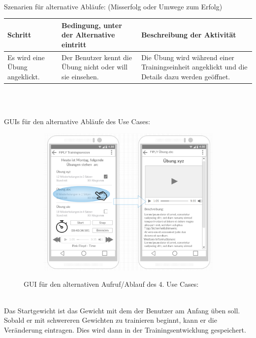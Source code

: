 \documentclass[FIPLY_base.tex]{subfiles}
\begin{document}
	\ \\
	Szenarien für alternative Abläufe: (Misserfolg oder Umwege zum Erfolg)
	\ \\
	\begin{center}	
		\def\arraystretch{1.3}%
		\begin{tabular}{| p{4cm} | p{4cm} | p{4cm} |}
			\hline
			\textbf{Schritt} & \textbf{Bedingung, unter der Alternative eintritt} & \textbf{Beschreibung der Aktivität}  \\ \hline 
			Es wird eine Übung angeklickt. & Der Benutzer kennt die Übung nicht oder will sie einsehen. & Die Übung wird während einer Trainingseinheit angeklickt und die Details dazu werden geöffnet.\\ \hline
		\end{tabular} \\
	\end{center}
	\ \\
	GUIs für  den alternative Abläufe des Use Cases:
	\ \\
	\begin{figure}[H]
		\begin{subfigure}[b]{0.3\textwidth}
			\includegraphics[scale=0.32]{img/Trainingssessionalternativ}
		\end{subfigure}
		\caption{GUI für den alternativen Aufruf/Ablauf des 4. Use Cases:}
	\end{figure}
	\ \\
	Das Startgewicht ist das Gewicht mit dem der Benutzer am Anfang üben soll. Sobald  er mit schwereren Gewichten zu trainieren beginnt, kann er die Veränderung eintragen. Dies wird dann in der Trainingsentwicklung gespeichert. 
	
\end{document}
